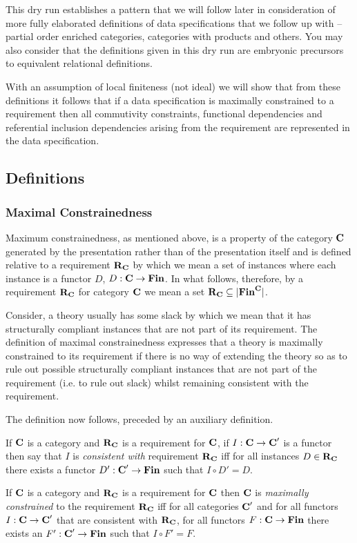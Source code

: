 \documentclass[10pt,a4paper]{article}
\theoremstyle{remark}
\renewcommand{\term}[1]{\textit{#1}}  %
\begin{document}
\note 
This dry run establishes a pattern that we will follow later in consideration of more fully elaborated 
definitions of 
data specifications that we follow up with -- partial order enriched categories, categories with products and others. 
You may also consider that the definitions given in this dry run are embryonic precursors to equivalent relational definitions.

\note
With an assumption of local finiteness (not ideal) we will show that from these definitions it follows that if a data specification is maximally constrained to a
requirement then  all commutivity constraints,  functional dependencies and referential inclusion dependencies arising from the requirement are represented in the data specification.

\subsection {Definitions}


\subsubsection{Maximal Constrainedness}
Maximum constrainedness, as mentioned above, is a property of the category $\textbf{C}$ generated by the presentation  rather than of the presentation itself and is defined  relative to a requirement $\textbf{R}_{\textbf{C}}$ by which we mean a set of 
instances where each instance is a functor $D$, $D: \textbf{C} \rightarrow \textbf{Fin}$. In what follows, therefore,  by a requirement $\textbf{R}_{\textbf{C}}$ for category $\textbf{C}$ we mean a set  $\textbf{R}_{\textbf{C}} \subseteq | \textbf{Fin}^{\textbf{C}} |$. 

Consider, a theory usually has some slack by which we mean that it has structurally compliant instances that are not part of its requirement.  The definition of maximal constrainedness expresses that a theory is maximally constrained to its requirement if there is no way of extending the theory so as to rule out possible structurally compliant instances that are not part of the requirement (i.e. to rule out slack) whilst remaining consistent with the requirement.

The definition now follows, preceded by an auxiliary definition.
\begin{definition}
If $\textbf{C}$ is a category and $\textbf{R}_{\textbf{C}}$ is a requirement for $\textbf{C}$,  if $I: \textbf{C} \rightarrow \textbf{C}'$ is a functor then say that $I$ is \term{consistent with} requirement $\textbf{R}_{\textbf{C}}$ iff for all instances $D \in \textbf{R}_{\textbf{C}}$ there exists a functor $D':\textbf{C}' \rightarrow \textbf{Fin}$ such that $I \circ D'=D$.
\end{definition}
\begin{definition}
If $\textbf{C}$ is a category and $\textbf{R}_{\textbf{C}}$ is a requirement for $\textbf{C}$ then $\textbf{C}$ is \term{maximally constrained} to the requirement $\textbf{R}_{\textbf{C}}$ iff for all categories $\textbf{C}'$ and for all functors $I:\textbf{C} \rightarrow \textbf{C}'$ that are consistent with $\textbf{R}_{\textbf{C}}$, for all functors $F: \textbf{C} \rightarrow \textbf{Fin}$  there exists an $F' : \textbf{C}' \rightarrow \textbf{Fin}$ such that $I \circ F'=F$.
\end{definition}
\end{document}
